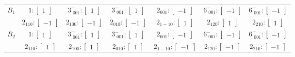 \documentclass[fleqn,8pt,landscape]{jsarticle}
\begin{document}
\begin{longtable}{ccccccc}
$ B_{1} $ & $ 1:\begin{bmatrix} 1 \end{bmatrix} $ & $ 3^{+}_{\,\,001}:\begin{bmatrix} 1 \end{bmatrix} $ & $ 3^{-}_{\,\,001}:\begin{bmatrix} 1 \end{bmatrix} $ & $ 2{}_{001}:\begin{bmatrix} -1 \end{bmatrix} $ & $ 6^{-}_{\,\,001}:\begin{bmatrix} -1 \end{bmatrix} $ & $ 6^{+}_{\,\,001}:\begin{bmatrix} -1 \end{bmatrix} $ \\
& $ 2{}_{110}:\begin{bmatrix} -1 \end{bmatrix} $ & $ 2{}_{100}:\begin{bmatrix} -1 \end{bmatrix} $ & $ 2{}_{010}:\begin{bmatrix} -1 \end{bmatrix} $ & $ 2{}_{1-10}:\begin{bmatrix} 1 \end{bmatrix} $ & $ 2{}_{120}:\begin{bmatrix} 1 \end{bmatrix} $ & $ 2{}_{210}:\begin{bmatrix} 1 \end{bmatrix} $ \\ \hline
$ B_{2} $ & $ 1:\begin{bmatrix} 1 \end{bmatrix} $ & $ 3^{+}_{\,\,001}:\begin{bmatrix} 1 \end{bmatrix} $ & $ 3^{-}_{\,\,001}:\begin{bmatrix} 1 \end{bmatrix} $ & $ 2{}_{001}:\begin{bmatrix} -1 \end{bmatrix} $ & $ 6^{-}_{\,\,001}:\begin{bmatrix} -1 \end{bmatrix} $ & $ 6^{+}_{\,\,001}:\begin{bmatrix} -1 \end{bmatrix} $ \\
& $ 2{}_{110}:\begin{bmatrix} 1 \end{bmatrix} $ & $ 2{}_{100}:\begin{bmatrix} 1 \end{bmatrix} $ & $ 2{}_{010}:\begin{bmatrix} 1 \end{bmatrix} $ & $ 2{}_{1-10}:\begin{bmatrix} -1 \end{bmatrix} $ & $ 2{}_{120}:\begin{bmatrix} -1 \end{bmatrix} $ & $ 2{}_{210}:\begin{bmatrix} -1 \end{bmatrix} $ \\ \hline

\end{longtable}
\end{document}

